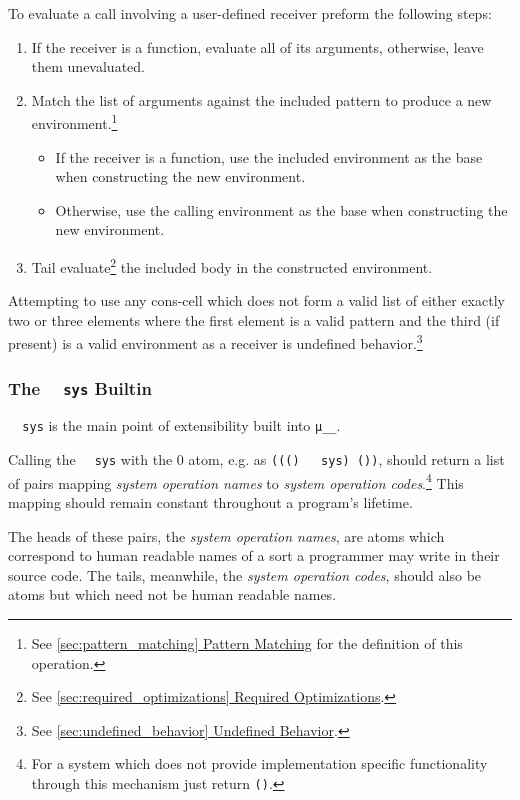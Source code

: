 \documentclass[twocolumn]{report}
\newcommand\muu{\texttt{μ\!\!\!\_\_}}
\newcommand{\intralink}[2]{\hyperref[#1]{\ref*{#1} #2}}
\begin{document}
To evaluate a call involving a user-defined receiver preform the following steps:
\begin{enumerate}
\item If the receiver is a function, evaluate all of its arguments, otherwise, leave them unevaluated.
\item Match the list of arguments against the included pattern to produce a new environment.\footnote{See \intralink{sec:pattern_matching}{Pattern Matching} for the definition of this operation.}
\begin{itemize}
\item If the receiver is a function, use the included environment as the base when constructing the new environment.
\item Otherwise, use the calling environment as the base when constructing the new environment.
\end{itemize}
\item Tail evaluate\footnote{See \intralink{sec:required_optimizations}{Required Optimizations}.} the included body in the constructed environment.
\end{enumerate}

Attempting to use any cons-cell which does not form a valid list of either exactly two or three elements where the first element is a valid pattern and the third (if present) is a valid environment as a receiver is undefined behavior.\footnote{See \intralink{sec:undefined_behavior}{Undefined Behavior}.}

\subsubsection{The \texttt{~~sys} Builtin}
\label{subsubsec:system_builtin}

\texttt{~~sys} is the main point of extensibility built into \muu.

Calling the \texttt{~~sys} with the $0$ atom, e.g. as \texttt{((() ~~sys) ())}, should return a list of pairs mapping \emph{system operation names} to \emph{system operation codes}.\footnote{For a system which does not provide implementation specific functionality through this mechanism just return \texttt{()}.}
This mapping should remain constant throughout a program's lifetime.

The heads of these pairs, the \emph{system operation names}, are atoms which correspond to human readable names of a sort a programmer may write in their source code.
The tails, meanwhile, the \emph{system operation codes}, should also be atoms but which need not be human readable names.
\end{document}
